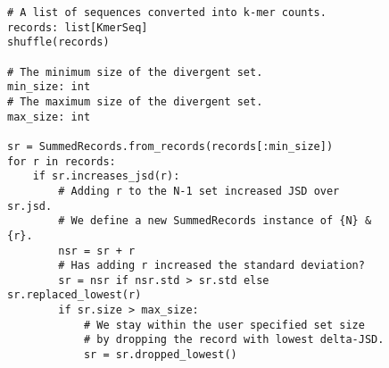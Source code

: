 \documentclass{article}
\begin{document}
\begin{figure}[h]
    \centering
        \begin{verbatim}
# A list of sequences converted into k-mer counts.
records: list[KmerSeq]
shuffle(records)

# The minimum size of the divergent set.
min_size: int
# The maximum size of the divergent set.
max_size: int

sr = SummedRecords.from_records(records[:min_size])
for r in records:
    if sr.increases_jsd(r):
        # Adding r to the N-1 set increased JSD over sr.jsd.
        # We define a new SummedRecords instance of {N} & {r}.
        nsr = sr + r
        # Has adding r increased the standard deviation?
        sr = nsr if nsr.std > sr.std else sr.replaced_lowest(r)
        if sr.size > max_size:
            # We stay within the user specified set size
            # by dropping the record with lowest delta-JSD.
            sr = sr.dropped_lowest()
            \end{verbatim}

\end{figure}
\end{document}
